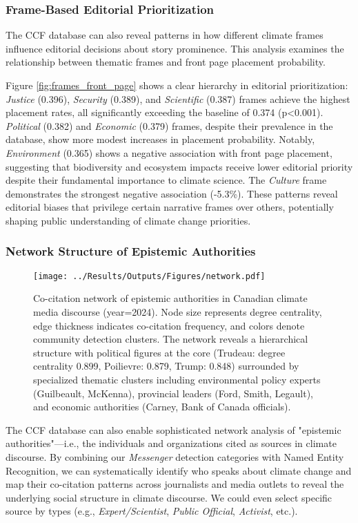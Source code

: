 \documentclass[12pt]{article}
\begin{document}
\subsubsection{Frame-Based Editorial Prioritization}

The CCF database can also reveal patterns in how different climate frames influence editorial decisions about story prominence. This analysis examines the relationship between thematic frames and front page placement probability.

Figure \ref{fig:frames_front_page} shows a clear hierarchy in editorial prioritization: \emph{Justice} (0.396), \emph{Security} (0.389), and \emph{Scientific} (0.387) frames achieve the highest placement rates, all significantly exceeding the baseline of 0.374 (p<0.001). \emph{Political} (0.382) and \emph{Economic} (0.379) frames, despite their prevalence in the database, show more modest increases in placement probability. Notably, \emph{Environment} (0.365) shows a negative association with front page placement, suggesting that biodiversity and ecosystem impacts receive lower editorial priority despite their fundamental importance to climate science. The \emph{Culture} frame demonstrates the strongest negative association (-5.3\%). These patterns reveal editorial biases that privilege certain narrative frames over others, potentially shaping public understanding of climate change priorities.

\subsubsection{Network Structure of Epistemic Authorities}

\begin{figure}[b!]
\centering
\texttt{[image: ../Results/Outputs/Figures/network.pdf]}
\caption{Co-citation network of epistemic authorities in Canadian climate media discourse (year=2024). Node size represents degree centrality, edge thickness indicates co-citation frequency, and colors denote community detection clusters. The network reveals a hierarchical structure with political figures at the core (Trudeau: degree centrality 0.899, Poilievre: 0.879, Trump: 0.848) surrounded by specialized thematic clusters including environmental policy experts (Guilbeault, McKenna), provincial leaders (Ford, Smith, Legault), and economic authorities (Carney, Bank of Canada officials).}
\label{fig:network}
\end{figure}

The CCF database can also enable sophisticated network analysis of "epistemic authorities"—i.e., the individuals and organizations cited as sources in climate discourse. By combining our \emph{Messenger} detection categories with Named Entity Recognition, we can systematically identify who speaks about climate change and map their co-citation patterns across journalists and media outlets to reveal the underlying social structure in climate discourse. We could even select specific source by types (e.g., \emph{Expert/Scientist}, \emph{Public Official}, \emph{Activist}, etc.). 
\end{document}
